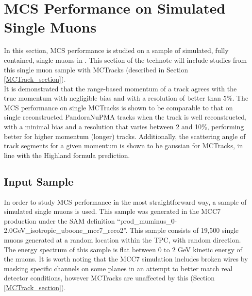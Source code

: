
\section{MCS Performance on Simulated Single Muons}\label{singlemuon_MC_section}

In this section, MCS performance is studied on a sample of simulated, fully contained, single muons in {\ub}. This section of the technote will include studies from this single muon sample with {\sc MCTracks} (described in Section \ref{MCTrack_section}).\\

It is demonstrated that the range-based momentum of a track agrees with the true momentum with negligible bias and with a resolution of better than 5\%. The MCS performance on single {\sc MCTracks} is shown to be comparable to that on single reconstructed PandoraNuPMA tracks when the track is well reconstructed, with a minimal bias and a resolution that varies between 2 and 10\%, performing better for higher momentum (longer) tracks. Additionally, the scattering angle of track segments for a given momentum is shown to be gaussian for {\sc MCTracks}, in line with the Highland formula prediction.


\subsection{Input Sample}\label{SingleMu_Input_Sample_section}
In order to study MCS performance in the most straightforward way, a sample of simulated single muons is used. This sample was generated in the {\ub} MCC7 production under the SAM definition ``prod\_muminus\_0-2.0GeV\_isotropic\_uboone\_mcc7\_reco2''. This sample consists of 19,500 single muons generated at a random location within the {\ub} TPC, with random direction. The energy spectrum of this sample is flat between 0 to 2 GeV kinetic energy of the muons. It is worth noting that the MCC7 simulation includes broken wires by masking specific channels on some planes in an attempt to better match real detector conditions, however {\sc MCTracks} are unaffected by this (Section \ref{MCTrack_section}).\\


